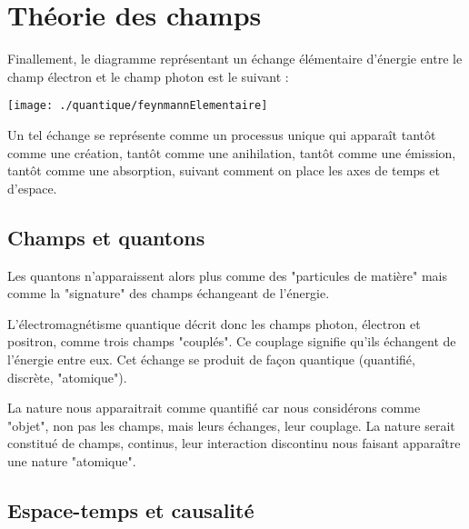 

\section{Théorie des champs}



Finallement, le diagramme représentant un échange élémentaire d'énergie entre le champ électron et le champ photon est le suivant :

\begin{center}
\texttt{[image: ./quantique/feynmannElementaire]}
\end{center}

Un tel échange se représente comme un processus unique qui apparaît tantôt comme une création, tantôt comme une anihilation, tantôt comme une émission, tantôt comme une absorption, suivant comment on place les axes de temps et d'espace.


\subsection{Champs et quantons}

Les quantons n'apparaissent alors plus comme des "particules de matière" mais comme la "signature" des champs échangeant de l'énergie.

L'électromagnétisme quantique décrit donc les champs photon, électron et positron, comme trois champs "couplés". Ce couplage signifie qu'ils échangent de l'énergie entre eux. Cet échange se produit de façon quantique (quantifié, discrète, "atomique").

La nature nous apparaitrait comme quantifié car nous considérons comme "objet", non pas les champs, mais leurs échanges, leur couplage. La nature serait constitué de champs, continus, leur interaction discontinu nous faisant apparaître une nature "atomique".  

\subsection{Espace-temps et causalité}

